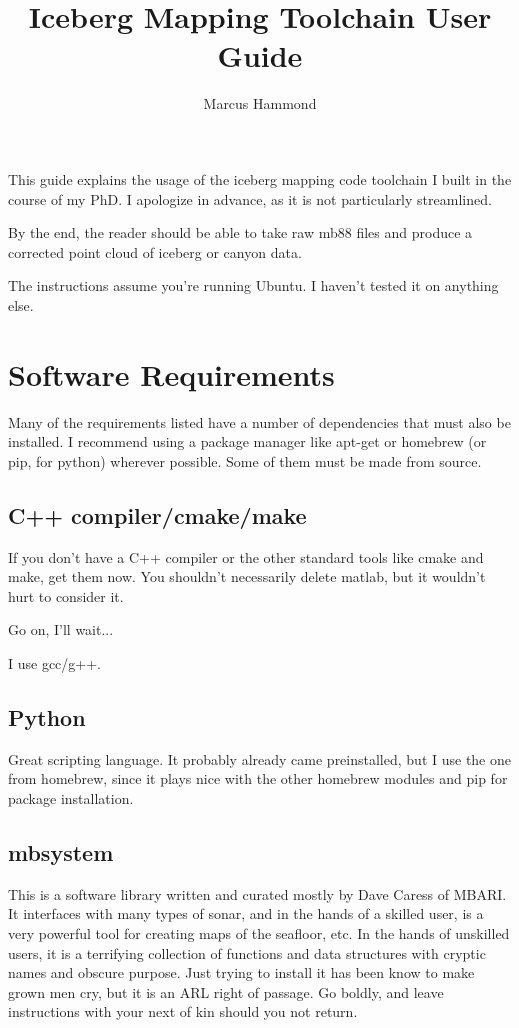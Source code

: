 \documentclass[12pt]{amsart}
\title{Iceberg Mapping Toolchain User Guide}
\author{Marcus Hammond}
\begin{document}
\maketitle
\tableofcontents

This guide explains the usage of the iceberg mapping code toolchain I built in the course of my PhD. I apologize in advance, as it is not particularly streamlined.

By the end, the reader should be able to take raw mb88 files and produce a corrected point cloud of iceberg or canyon data. 

The instructions assume you're running Ubuntu. I haven't tested it on anything else. 

\section{Software Requirements}

Many of the requirements listed have a number of dependencies that must also be installed. I recommend using a package manager like apt-get or homebrew (or pip, for python) wherever possible. Some of them must be made from source.

\subsection*{C++ compiler/cmake/make}
If you don't have a C++ compiler or the other standard tools like cmake and make, get them now. You shouldn't necessarily delete matlab, but it wouldn't hurt to consider it.

Go on, I'll wait...

I use gcc/g++.

\subsection*{Python}
Great scripting language. It probably already came preinstalled, but I use the one from homebrew, since it plays nice with the other homebrew modules and pip for package installation.

\subsection*{mbsystem}
This is a software library written and curated mostly by Dave Caress of MBARI. It interfaces with many types of sonar, and in the hands of a skilled user, is a very powerful tool for creating maps of the seafloor, etc. In the hands of unskilled users, it is a terrifying collection of functions and data structures with cryptic names and obscure purpose. Just trying to install it has been know to make grown men cry, but it is an ARL right of passage. Go boldly, and leave instructions with your next of kin should you not return.
\end{document}
